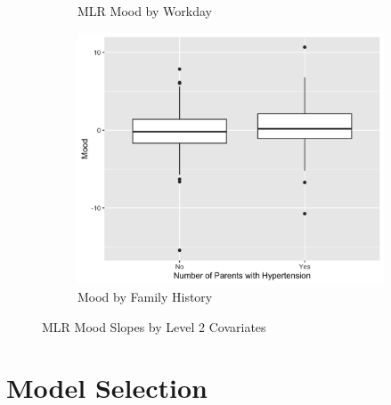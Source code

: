 \documentclass[12pt,twoside,letterpaper]{article}
\theoremstyle{definition}
\theoremstyle{definition}
\begin{document}
\begin{figure}
\begin{subfigure}[b]{0.32\textwidth}
                    \caption[]%
                    {{\small MLR Mood by Workday}}
                    \label{fig: mood v day}
                    \end{subfigure}
                    \hfill
                    \begin{subfigure}[b]{0.32\textwidth}
                    \centering
                    \includegraphics[width=\textwidth]{pics/mlr mood by fh.png}
                    \caption[]%
                    {{\small Mood by Family History}}
                    \label{fig: mood v fh}
                    \end{subfigure}
                    \caption[]
                    {\small MLR Mood Slopes by Level 2 Covariates}
                    \label{fig: mood v lv2}
                    \end{figure}
                

\section{Model Selection}\label{sec: model selection}
\end{document}
